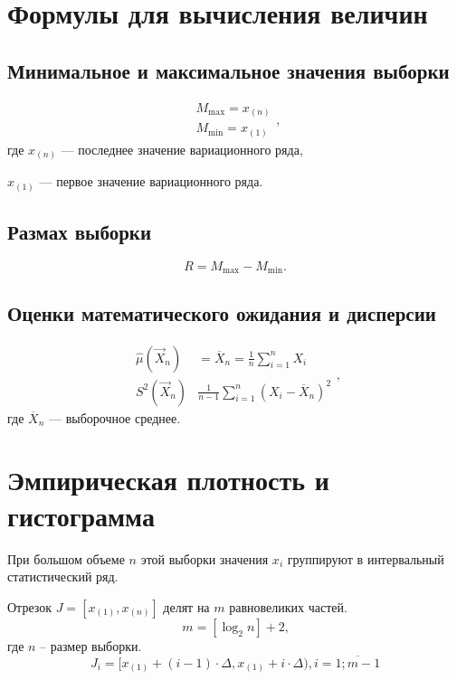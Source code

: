 \documentclass[12pt]{report}
\begin{document}
\section{Формулы для вычисления величин}

\subsection{Минимальное и максимальное значения выборки}
\begin{equation}
    \begin{aligned}
        M_{\max} = x_{(n)}\\
        M_{\min} = x_{(1)}
    \end{aligned}\text{,}
\end{equation}
где $ x_{(n)}$ --- последнее значение вариационного ряда,

$x_{(1)}$ --- первое значение вариационного ряда.

\subsection{Размах выборки}
\begin{equation}
    R = M_{\max} - M_{\min}.
\end{equation}

\subsection{Оценки математического ожидания и дисперсии}
\begin{equation}
    \begin{aligned}
    \hat\mu(\vec X_n) &= \overline X_n = \frac 1n \sum_{i=1}^n X_i\\
    S^2(\vec X_n) & \frac 1{n-1} \sum_{i=1}^n (X_i-\overline X_n)^2
    \end{aligned}\text{,}
\end{equation}
где $\overline X_n$ --- выборочное среднее.
\section{Эмпирическая плотность и гистограмма}

При большом объеме $n$ этой выборки  значения $x_i$ группируют в интервальный статистический ряд. 

Отрезок $J = [x_{(1)}, x_{(n)}]$ делят на $m$ равновеликих частей.
\begin{equation}
	m=[\log_2n]+2\text{,}
\end{equation}
 где $n$ -- размер выборки.
\begin{equation}
    J_i = [x_{(1)} + (i - 1) \cdot \Delta, x_{(1)} + i \cdot \Delta), i = \overline{1; m - 1}
\end{equation}
\end{document}
